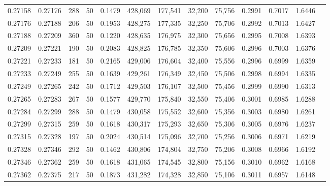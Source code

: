 \begin{tabular}{rrrrrrrrrrrrr}
0.27158 & 0.27176 &   288 &  50 &                                     0.1479 & 428,069 & 177,541 &  32,200 &  75,756 & 0.2991 & 0.7017 & 1.6446 \\
0.27176 & 0.27188 &   206 &  50 &                                     0.1953 & 428,275 & 177,335 &  32,250 &  75,706 & 0.2992 & 0.7013 & 1.6427 \\
0.27188 & 0.27209 &   360 &  50 &                                     0.1220 & 428,635 & 176,975 &  32,300 &  75,656 & 0.2995 & 0.7008 & 1.6393 \\
0.27209 & 0.27221 &   190 &  50 &                                     0.2083 & 428,825 & 176,785 &  32,350 &  75,606 & 0.2996 & 0.7003 & 1.6376 \\
0.27221 & 0.27233 &   181 &  50 &                                     0.2165 & 429,006 & 176,604 &  32,400 &  75,556 & 0.2996 & 0.6999 & 1.6359 \\
0.27233 & 0.27249 &   255 &  50 &                                     0.1639 & 429,261 & 176,349 &  32,450 &  75,506 & 0.2998 & 0.6994 & 1.6335 \\
0.27249 & 0.27265 &   242 &  50 &                                     0.1712 & 429,503 & 176,107 &  32,500 &  75,456 & 0.2999 & 0.6990 & 1.6313 \\
0.27265 & 0.27283 &   267 &  50 &                                     0.1577 & 429,770 & 175,840 &  32,550 &  75,406 & 0.3001 & 0.6985 & 1.6288 \\
0.27284 & 0.27299 &   288 &  50 &                                     0.1479 & 430,058 & 175,552 &  32,600 &  75,356 & 0.3003 & 0.6980 & 1.6261 \\
0.27299 & 0.27315 &   259 &  50 &                                     0.1618 & 430,317 & 175,293 &  32,650 &  75,306 & 0.3005 & 0.6976 & 1.6237 \\
0.27315 & 0.27328 &   197 &  50 &                                     0.2024 & 430,514 & 175,096 &  32,700 &  75,256 & 0.3006 & 0.6971 & 1.6219 \\
0.27328 & 0.27346 &   292 &  50 &                                     0.1462 & 430,806 & 174,804 &  32,750 &  75,206 & 0.3008 & 0.6966 & 1.6192 \\
0.27346 & 0.27362 &   259 &  50 &                                     0.1618 & 431,065 & 174,545 &  32,800 &  75,156 & 0.3010 & 0.6962 & 1.6168 \\
0.27362 & 0.27375 &   217 &  50 &                                     0.1873 & 431,282 & 174,328 &  32,850 &  75,106 & 0.3011 & 0.6957 & 1.6148 \\

\end{tabular}

